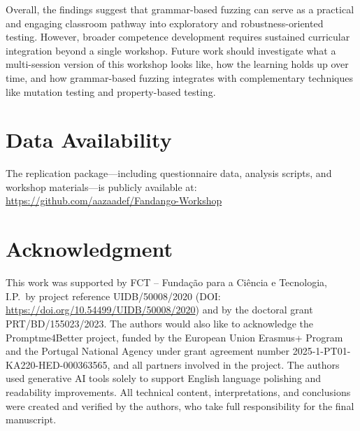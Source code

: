 \documentclass[conference]{IEEEtran}
\begin{document}
Overall, the findings suggest that grammar-based fuzzing can serve as a practical and engaging classroom pathway into exploratory and robustness-oriented testing.
However, broader competence development requires sustained curricular integration beyond a single workshop.
Future work should investigate what a multi-session version of this workshop looks like, how the learning holds up over time, and how grammar-based fuzzing integrates with complementary techniques like mutation testing and property-based testing.

\section*{Data Availability}
The replication package---including questionnaire data, analysis scripts, and workshop materials---is publicly available at: \url{https://github.com/aazaadef/Fandango-Workshop}

\section*{Acknowledgment}
This work was supported by FCT -- Funda\c{c}\~{a}o para a Ci\^{e}ncia e Tecnologia, I.P.\ by project reference UIDB/50008/2020 (DOI: \url{https://doi.org/10.54499/UIDB/50008/2020}) and by the doctoral grant PRT/BD/155023/2023.
The authors would also like to acknowledge the Promptme4Better project, funded by the European Union Erasmus+ Program and the Portugal National Agency under grant agreement number 2025-1-PT01-KA220-HED-000363565, and all partners involved in the project.
The authors used generative AI tools solely to support English language polishing and readability improvements.
All technical content, interpretations, and conclusions were created and verified by the authors, who take full responsibility for the final manuscript.
\end{document}
